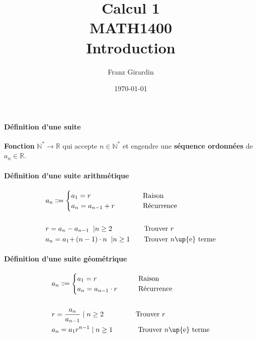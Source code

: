 \documentclass{report}
\title{\Huge{Calcul 1}\\{MATH1400}\\{\textbf{Introduction}}}
\author{\huge{Franz Girardin}}
\date{\today}
\begin{document}
\maketitle

\pagebreak

\pagebreak
\begin{multicols*}{3}


    \footnotesize

    \paragraph{Définition d'une suite}
        \textbf{Fonction} $\mathbb{N}^* 
        \rightarrow \mathbb{R}$ qui accepte 
        $n \in \mathbb{N}^*$ et engendre une \textbf{séquence ordonnées} de $a_n \in \mathbb{R}$. 


    \paragraph{Définition d'une suite arithmétique}    
        \begin{align*}
                &a_n \Coloneqq 
                \begin{cases}
                    a_1 = r  &\omit\quad\quad\quad Raison\\  
                    a_{n} = a_{n-1} + r &\omit\hfill \quad\quad\quad Récurrence
                \end{cases}
                \\\\
                &r = a_n - a_{n-1} \;\;| n \geq 2  
                \quad\quad\quad\quad\;\;\text{Trouver $r$} \\
                &a_n = a_1 \text{+} \left(n - 1\right)\cdot{n}  \;\;|n \geq 1  
                \quad\quad\text{Trouver $n$\up{e} terme}
        \end{align*}
    \paragraph{Définition d'une suite géométrique}
        \begin{align*}
                &a_n \Coloneqq 
                \begin{cases}
                    a_1 = r  &\omit\quad\quad Raison\\  
                    a_{n} = a_{n-1} \cdot r &\omit\hfill 
                    \quad\quad Récurrence
                \end{cases}
                \\\\ 
                &r = \frac{a_n}{a_{n-1}} \; | \; n \geq 2
                \quad\quad\quad\quad\;\;\text{Trouver $r$} \\ 
                &a_n = a_1r^{n - 1} \; | \; n \geq 1
                \text{\quad\quad\quad\; Trouver $n$\up{e} terme}
        \end{align*}







\end{multicols*}
\end{document}
